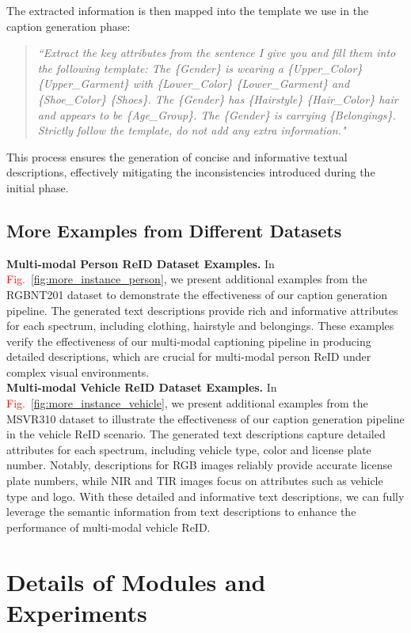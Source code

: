 %
The extracted information is then mapped into the template we use in the caption generation phase:
\begin{quote}
  \small
\textit{“Extract the key attributes from the sentence I give you and fill them into the following template: The \{Gender\} is wearing a \{Upper\_Color\} \{Upper\_Garment\} with \{Lower\_Color\} \{Lower\_Garment\} and \{Shoe\_Color\} \{Shoes\}. The \{Gender\} has \{Hairstyle\} \{Hair\_Color\} hair and appears to be \{Age\_Group\}. The \{Gender\} is carrying \{Belongings\}. Strictly follow the template, do not add any extra information."}
\end{quote}
%
This process ensures the generation of concise and informative textual descriptions, effectively mitigating the inconsistencies introduced during the initial phase.
\subsection{More Examples from Different Datasets}
\textbf{Multi-modal Person ReID Dataset Examples.}
%
In \textcolor{red}{Fig.}~\ref{fig:more_instance_person}, we present additional examples from the RGBNT201 dataset to demonstrate the effectiveness of our caption generation pipeline.
%
The generated text descriptions provide rich and informative attributes for each spectrum, including clothing, hairstyle and belongings.
%
These examples verify the effectiveness of our multi-modal captioning pipeline in producing detailed descriptions, which are crucial for multi-modal person ReID under complex visual environments.
%
\\
\textbf{Multi-modal Vehicle ReID Dataset Examples.}
%
In \textcolor{red}{Fig.}~\ref{fig:more_instance_vehicle}, we present additional examples from the MSVR310 dataset to illustrate the effectiveness of our caption generation pipeline in the vehicle ReID scenario.
%
The generated text descriptions capture detailed attributes for each spectrum, including vehicle type, color and license plate number.
%
Notably, descriptions for RGB images reliably provide accurate license plate numbers, while NIR and TIR images focus on attributes such as vehicle type and logo.
%
With these detailed and informative text descriptions, we can fully leverage the semantic information from text descriptions to enhance the performance of multi-modal vehicle ReID.
\section{Details of Modules and Experiments}

